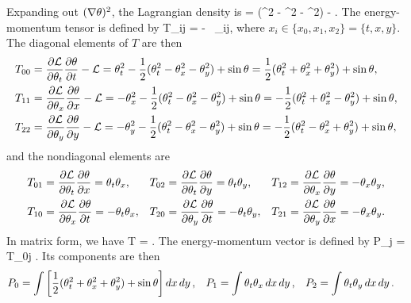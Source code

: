 \begin{solution}
	Expanding out $(\nabla\theta)^2$, the Lagrangian density is
	\beqn \label{lagr3}
		\Ld =  (\thtt^2 - \thtx^2 - \thty^2) - \sint.
	\eeqn
	The energy-momentum tensor is defined by
	\beq
		T_{ij} =   - \Ld \, \delta_{ij},
	\eeq
	where $x_i \in \{ x_0, x_1, x_2 \} = \{ t, x, y \}$.  The diagonal elements of $T$ are then
	\begin{align*}
		T_{00} &= \pdv{\mathcal{L}}{\theta_t} \pdv{\theta}{t} - \mathcal{L} = \theta_t^2 - \frac{1}{2} (\theta_t^2 - \theta_x^2 - \theta_y^2) + \sin{\theta} = \frac{1}{2} (\theta_t^2 + \theta_x^2 + \theta_y^2) + \sin{\theta}, \\
		T_{11} &= \pdv{\mathcal{L}}{\theta_x} \pdv{\theta}{x} - \mathcal{L} = -\theta_x^2 - \frac{1}{2} (\theta_t^2 - \theta_x^2 - \theta_y^2) + \sin{\theta} = -\frac{1}{2} (\theta_t^2 + \theta_x^2 - \theta_y^2) + \sin{\theta}, \\
		T_{22} &= \pdv{\mathcal{L}}{\theta_y} \pdv{\theta}{y} - \mathcal{L} = -\theta_y^2 - \frac{1}{2} (\theta_t^2 - \theta_x^2 - \theta_y^2) + \sin{\theta} = -\frac{1}{2} (\theta_t^2 - \theta_x^2 + \theta_y^2) + \sin{\theta},
	\end{align*}
	and the nondiagonal elements are
	\begin{align*}
		T_{01} &= \pdv{\mathcal{L}}{\theta_t} \pdv{\theta}{x} = \theta_t \theta_x, &
		T_{02} &= \pdv{\mathcal{L}}{\theta_t} \pdv{\theta}{y} = \theta_t \theta_y, &
		T_{12} &= \pdv{\mathcal{L}}{\theta_x} \pdv{\theta}{y} = -\theta_x \theta_y, \\
		T_{10} &= \pdv{\mathcal{L}}{\theta_x} \pdv{\theta}{t} = -\theta_t \theta_x, &
		T_{20} &= \pdv{\mathcal{L}}{\theta_y} \pdv{\theta}{t} = -\theta_t \theta_y, &
		T_{21} &= \pdv{\mathcal{L}}{\theta_y} \pdv{\theta}{x} = -\theta_x \theta_y.
	\end{align*}
	In matrix form, we have
	\beq
		T = .
	\eeq
	The energy-momentum vector is defined by
	\beq
		P_j = \int T_{0j}  .
	\eeq
	Its components are then
	\begin{align*}
		P_0 &= \int \left[ \frac{1}{2} (\theta_t^2 + \theta_x^2 + \theta_y^2) + \sin{\theta} \right] \dd{x} \dd{y}, &
		P_1 &= \int \theta_t \theta_x \dd{x} \dd{y}, &
		P_2 &= \int \theta_t \theta_y \dd{x} \dd{y}.
	\end{align*}
\vfix
\end{solution}